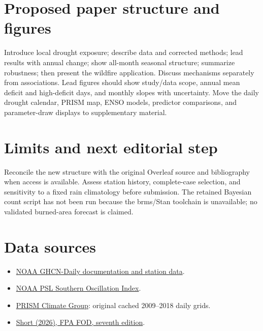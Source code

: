 \documentclass[11pt]{article}
\begin{document}
\section{Proposed paper structure and figures}
Introduce local drought exposure; describe data and corrected methods; lead results with annual change; show all-month seasonal structure; summarize robustness; then present the wildfire application. Discuss mechanisms separately from associations. Lead figures should show study/data scope, annual mean deficit and high-deficit days, and monthly slopes with uncertainty. Move the daily drought calendar, PRISM map, ENSO models, predictor comparisons, and parameter-draw displays to supplementary material.

\section{Limits and next editorial step}
Reconcile the new structure with the original Overleaf source and bibliography when access is available. Assess station history, complete-case selection, and sensitivity to a fixed rain climatology before submission. The retained Bayesian count script has not been run because the brms/Stan toolchain is unavailable; no validated burned-area forecast is claimed.

\section*{Data sources}
\begin{itemize}
\item \href{https://www.ncei.noaa.gov/pub/data/ghcn/daily/readme.txt}{NOAA GHCN-Daily documentation and station data}.
\item \href{https://psl.noaa.gov/data/correlation/soi.data}{NOAA PSL Southern Oscillation Index}.
\item \href{https://prism.oregonstate.edu/}{PRISM Climate Group}: original cached 2009--2018 daily grids.
\item \href{https://doi.org/10.2737/RDS-2013-0009.7}{Short (2026), FPA FOD, seventh edition}.
\end{itemize}
\end{document}
